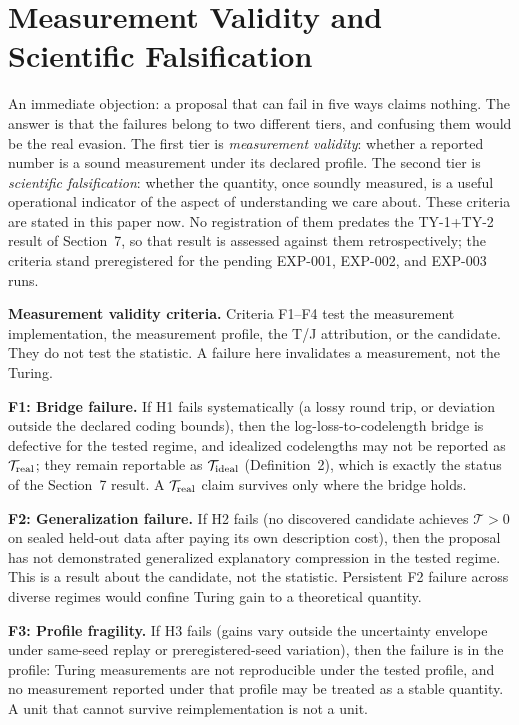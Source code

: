 \documentclass[11pt]{article}
\begin{document}
\section{Measurement Validity and Scientific Falsification}

An immediate objection: a proposal that can fail in five ways claims nothing. The answer is that the failures belong to two different tiers, and confusing them would be the real evasion. The first tier is \textit{measurement validity}: whether a reported number is a sound measurement under its declared profile. The second tier is \textit{scientific falsification}: whether the quantity, once soundly measured, is a useful operational indicator of the aspect of understanding we care about. These criteria are stated in this paper now. No registration of them predates the TY-1+TY-2 result of Section~7, so that result is assessed against them retrospectively; the criteria stand preregistered for the pending EXP-001, EXP-002, and EXP-003 runs.

\textbf{Measurement validity criteria.} Criteria F1--F4 test the measurement implementation, the measurement profile, the T/J attribution, or the candidate. They do not test the statistic. A failure here invalidates a measurement, not the Turing.

\textbf{F1: Bridge failure.} If H1 fails systematically (a lossy round trip, or deviation outside the declared coding bounds), then the log-loss-to-codelength bridge is defective for the tested regime, and idealized codelengths may not be reported as \(\mathcal{T}_{\rm real}\); they remain reportable as \(\mathcal{T}_{\rm ideal}\) (Definition~2), which is exactly the status of the Section~7 result. A \(\mathcal{T}_{\rm real}\) claim survives only where the bridge holds.

\textbf{F2: Generalization failure.} If H2 fails (no discovered candidate achieves \(\mathcal{T}>0\) on sealed held-out data after paying its own description cost), then the proposal has not demonstrated generalized explanatory compression in the tested regime. This is a result about the candidate, not the statistic. Persistent F2 failure across diverse regimes would confine Turing gain to a theoretical quantity.

\textbf{F3: Profile fragility.} If H3 fails (gains vary outside the uncertainty envelope under same-seed replay or preregistered-seed variation), then the failure is in the profile: Turing measurements are not reproducible under the tested profile, and no measurement reported under that profile may be treated as a stable quantity. A unit that cannot survive reimplementation is not a unit.
\end{document}
